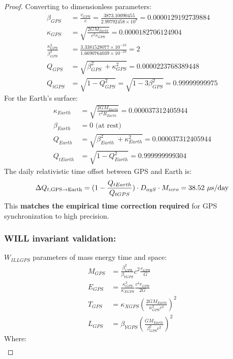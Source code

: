 \documentclass[12pt, a4paper]{article}
\begin{document}
\begin{proof}
Converting to dimensionless parameters:
\begin{align}
\beta_{GPS} &= \frac{v_{GPS}}{c} = \frac{3873.10090455}{2.99792458 \times 10^8} =0.0000129192739884 \\
\kappa_{GPS} &= \sqrt{\frac{2GM_{Earth}}{c^2 r_{GPS}}} =0.0000182706124904 \\
\frac{\kappa_{GPS}^{2}}{\beta_{GPS}^{2}} &=\frac{3.3381528077\times10^{-10}}{1.6690764039\times10^{-10}}=2 \\
Q_{GPS} &=\sqrt{\beta_{GPS}^{2}\ +\kappa_{GPS}^{2}}=0.0000223768389448 \\
Q_{tGPS} &=\sqrt{1-Q_{GPS}^{2}}=\sqrt{1-3\beta_{GPS}^{2}}=0.99999999975
\end{align}
For the Earth's surface:
\begin{align}
\kappa_{Earth} &= \sqrt{\frac{2GM_{Earth}}{c^2 R_{Earth}}} = 0.000037312405944\\
\beta_{Earth} &= 0 \text{ (at rest)} \\
Q_{Earth} &=\sqrt{\beta_{Earth}^{2}\ +\kappa_{Earth}^{2}}=0.000037312405944 \\
Q_{tEarth} &=\sqrt{1-Q_{Earth}^{2}}=0.999999999304
\end{align}
The daily relativistic time offset between GPS and Earth is:
\[
\Delta Q_{t,{\rm GPS} \rightarrow {\rm Earth}} = (1-\frac{Q_{tEarth}}{Q_{tGPS}})\cdot D_{ayS}\cdot M_{icro}= 38.52~\mu\text{s/day}
\]
This \textbf{matches the empirical time correction required} for GPS synchronization  to high precision.

\subsubsection{WILL invariant validation:}

$W_{ILLGPS}$ parameters of mass energy time and space:
\begin{align*}

M_{GPS} &= \frac{ \beta_{GPS}^2}{\beta_{YGPS}} c^2 \frac{r_{GPS}}{G} \\

E_{GPS} &=\frac{\kappa_{GPS}^2}{\kappa_{XGPS}} \frac{ c^4 r_{GPS}}{2G} \\

T_{GPS} &= \kappa_{XGPS} \left(\frac{2GM_{Earth}}{\kappa_{GPS}^2 c^3}\right)^2 \\

L_{GPS} &= \beta_{YGPS} \left(\frac{GM_{Earth}}{\beta_{GPS}^2 c^2}\right)^2

\end{align*}
Where:
\begin{align*}


\end{align*}
\end{proof}
\end{document}
